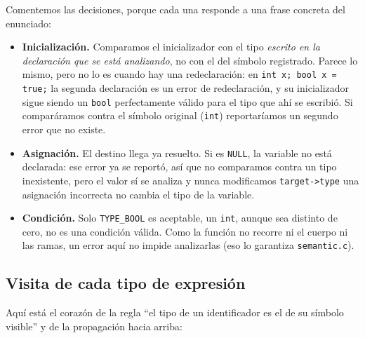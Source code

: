 \documentclass[12pt,letterpaper]{article}
\begin{document}
\bigskip

Comentemos las decisiones, porque cada una responde a una frase concreta del enunciado:

\begin{itemize}
\item \textbf{Inicialización.} Comparamos el inicializador con el tipo \emph{escrito en la declaración que se
  está analizando}, no con el del símbolo registrado. Parece lo mismo, pero no lo es cuando hay una
  redeclaración: en \texttt{int x; bool x = true;} la segunda declaración es un error de redeclaración, y
  su inicializador sigue siendo un \texttt{bool} perfectamente válido para el tipo que ahí se escribió. Si
  comparáramos contra el símbolo original (\texttt{int}) reportaríamos un segundo error que no existe.

\item \textbf{Asignación.} El destino llega ya resuelto. Si es \texttt{NULL}, la variable no está declarada: ese
  error ya se reportó, así que no comparamos contra un tipo inexistente, pero el valor sí se analiza y nunca
  modificamos \texttt{target->type} una asignación incorrecta no cambia el tipo de la variable.

\item \textbf{Condición.} Solo \texttt{TYPE\_BOOL} es aceptable, un \texttt{int}, aunque sea distinto de cero, no
  es una condición válida. Como la función no recorre ni el cuerpo ni las ramas, un error aquí no impide
  analizarlas (eso lo garantiza \texttt{semantic.c}).
\end{itemize}

\subsection*{Visita de cada tipo de expresión}

Aquí está el corazón de la regla ``el tipo de un identificador es el de su símbolo visible'' y de la
propagación hacia arriba:
\end{document}
